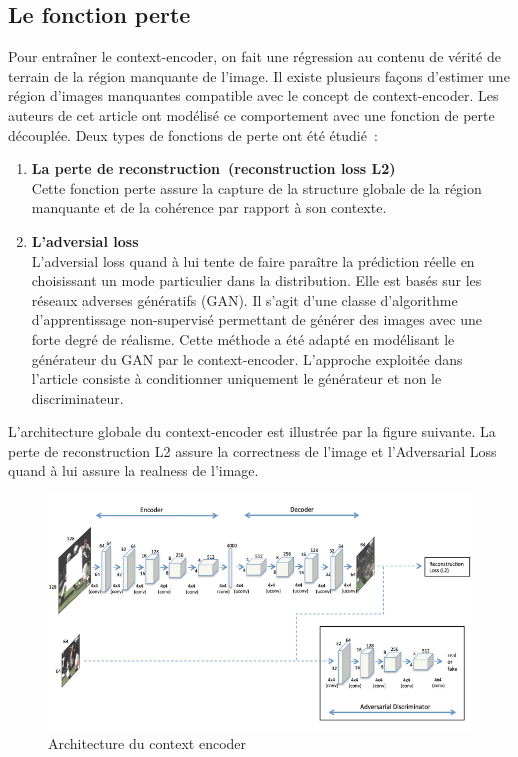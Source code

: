 \documentclass[11pt,a4paper]{article}
\begin{document}
        \subsection{Le fonction perte}
            Pour entraîner le context-encoder, on fait une régression au contenu de vérité de terrain de la région manquante de l’image.  Il existe plusieurs façons d’estimer une région d’images manquantes compatible avec le concept de context-encoder. Les auteurs de cet article ont modélisé ce comportement avec une fonction de perte découplée.  Deux types de fonctions de perte ont été étudié :
            \begin{enumerate}[noitemsep]
                \item \textbf{La perte de reconstruction (reconstruction loss L2)}\\
                Cette fonction perte assure la capture de la structure globale de la région manquante et de la cohérence par rapport à son contexte. 
                \item \textbf{L’adversial loss}\\
                L’adversial loss quand à lui tente de faire paraître la prédiction réelle en choisissant un mode particulier dans la distribution. Elle est basés sur les réseaux adverses génératifs (GAN). Il s’agit d’une classe d’algorithme d’apprentissage non-supervisé permettant de générer des images avec une forte degré de réalisme. Cette méthode a été adapté en modélisant le générateur du GAN par le context-encoder. L’approche exploitée dans l’article consiste à conditionner uniquement le générateur et non le discriminateur.
            \end{enumerate}
            L’architecture globale du context-encoder est illustrée par la figure suivante. La perte de reconstruction L2 assure la correctness de l'image et l'Adversarial Loss quand à lui assure la realness de l’image.
            \begin{figure}[H]
                \centering
                \includegraphics[scale=0.55]{architecture.png} 
                \caption{Architecture du context encoder}
            \end{figure}
\end{document}
